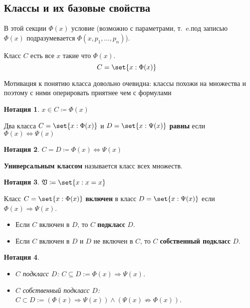 \documentclass{article}
\newcommand{\ie}{т{.}~e{.}}
\newtheorem*{defnotation}{Нотация}
\newcommand{\class}[1]{\set{#1}}
\newcommand{\UniversalClass}{\mathfrak{V}}
\begin{document}
\subsection{Классы и их базовые свойства}
В этой секции \(\Phi(x)\) условие (возможно с параметрами, \ie под записью \(\Phi(x)\) подразумевается \(\Phi(x, p_1, \ldots, p_n)\)). 
\begin{definition}
    \label{def:class}
    Класс \(C\) есть все \(x\) такие что \(\Phi(x)\).
    \[
        C = \class{x : \Phi(x)}
    \]
\end{definition} 
Мотивация к понятию класса довольно очевидна: классы похожи на множества и поэтому с ними оперировать приятнее чем с формулами
\begin{defnotation}
    \(x \in C \coloneq \Phi(x)\)
\end{defnotation}

\begin{definition}
    \label{def:class-equality}
    Два класса \(C = \class{x : \Phi(x)}\) и \(D = \class{x : \Psi(x)}\) \textbf{равны} если \(\Phi(x) \Leftrightarrow \Psi(x)\)
\end{definition}
\begin{defnotation}
    \(C = D \coloneq \Phi(x) \Leftrightarrow \Psi(x)\)
\end{defnotation}

\begin{definition}
    \label{def:universal-class}
    \textbf{Универсальным классом} называется класс всех множеств.
\end{definition}
\begin{defnotation}
    \(\UniversalClass \coloneq \class{x: x = x}\)
\end{defnotation}

\begin{definition}
    \label{def:subclasses}
    Класс \(C = \class{x : \Phi(x)}\) \textbf{включен} в класс \(D = \class{x : \Psi(x)}\) если \(\Phi(x) \Rightarrow \Psi(x)\). 
    \begin{itemize}
        \item Если \(C\) включен в \(D\), то \(C\) \textbf{подкласс} \(D\).
        \item Если \(C\) включен в \(D\) и \(D\) не включен в \(C\), то  \(C\) \textbf{собственный подкласс} \(D\).
    \end{itemize}
\end{definition}
\begin{defnotation} \  
    \begin{itemize}
        \item \(C\) подкласс \(D\): \(C \subseteq D := \Phi(x) \Rightarrow \Psi(x)\).
        \item \(C\) собственный подкласс \(D\): \(C \subset D := \left(\Phi(x) \Rightarrow \Psi(x)\right) \land \left(\Psi(x) \not\Rightarrow \Phi(x)\right)\).
    \end{itemize}
\end{defnotation}
\end{document}
